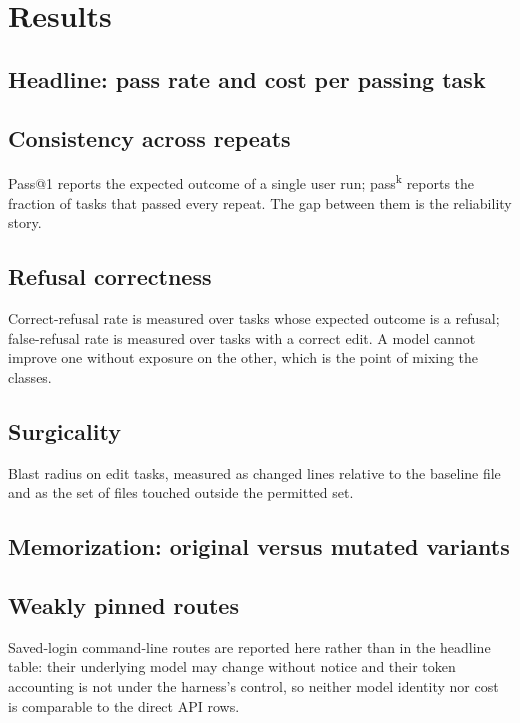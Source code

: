 \section{Results}
\label{sec:results}


\subsection{Headline: pass rate and cost per passing task}

\tableHeadline

\subsection{Consistency across repeats}

Pass@1 reports the expected outcome of a single user run; pass\textsuperscript{k} reports the fraction of tasks that passed every repeat. The gap between them is the reliability story.

\tableConsistency

\subsection{Refusal correctness}

Correct-refusal rate is measured over tasks whose expected outcome is a refusal; false-refusal rate is measured over tasks with a correct edit. A model cannot improve one without exposure on the other, which is the point of mixing the classes.

\tableRefusal

\subsection{Surgicality}

Blast radius on edit tasks, measured as changed lines relative to the baseline file and as the set of files touched outside the permitted set.

\tableSurgicality

\subsection{Memorization: original versus mutated variants}

\tableVariantGap

\subsection{Weakly pinned routes}

Saved-login command-line routes are reported here rather than in the headline table: their underlying model may change without notice and their token accounting is not under the harness's control, so neither model identity nor cost is comparable to the direct API rows.

\tableSavedLogin
